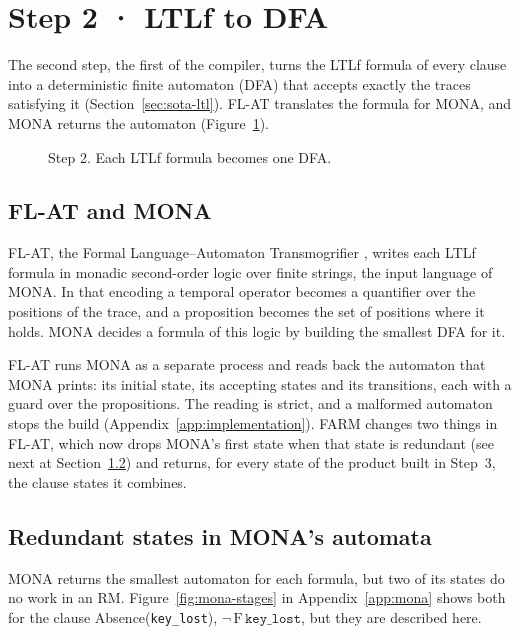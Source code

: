 \documentclass[11pt,english,listoffigures,listoftables]{tfgetsinf}
\begin{document}
\section{Step 2 · LTLf to DFA}
\label{sec:step2}
The second step, the first of the compiler, turns the LTLf formula of every clause into a deterministic finite automaton (DFA) that accepts exactly the traces satisfying it (Section~\ref{sec:sota-ltl}). FL-AT translates the formula for MONA, and MONA returns the automaton (Figure~\ref{fig:step2}).

\begin{figure}[H]
\centering
{}
\caption[Step 2 of FARM]{Step 2. Each LTLf formula becomes one DFA.}
\label{fig:step2}
\end{figure}

\subsection{FL-AT and MONA}
FL-AT, the Formal Language--Automaton Transmogrifier \cite{transmogrifier2020}, writes each LTLf formula in monadic second-order logic over finite strings, the input language of MONA. In that encoding a temporal operator becomes a quantifier over the positions of the trace, and a proposition becomes the set of positions where it holds. MONA \cite{henriksen1995mona} decides a formula of this logic by building the smallest DFA for it.

FL-AT runs MONA as a separate process and reads back the automaton that MONA prints: its initial state, its accepting states and its transitions, each with a guard over the propositions. The reading is strict, and a malformed automaton stops the build (Appendix~\ref{app:implementation}). FARM changes two things in FL-AT, which now drops MONA's first state when that state is redundant (see next at Section~\ref{sec:redundant}) and returns, for every state of the product built in Step~3, the clause states it combines.

\subsection{Redundant states in MONA's automata}
\label{sec:redundant}
MONA returns the smallest automaton for each formula, but two of its states do no work in an RM. Figure~\ref{fig:mona-stages} in Appendix~\ref{app:mona} shows both for the clause Absence(\texttt{key\_lost}), $\neg\,\mathrm{F}\,\texttt{key\_lost}$, but they are described here.
\end{document}
